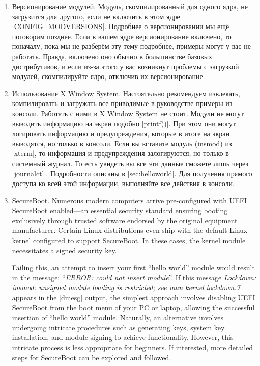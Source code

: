 \documentclass[10pt, oneside]{book}
\begin{document}
\begin{enumerate}
  \item Версионирование модулей.
        Модуль, скомпилированный для одного ядра, не загрузится для другого, если не включить в этом ядре \cpp|CONFIG_MODVERSIONS|. Подробнее о версионировании мы ещё поговорим позднее. Если в вашем ядре версионирование включено, то поначалу, пока мы не разберём эту тему подробнее,
        примеры могут у вас не работать. Правда, включено оно обычно в большинстве базовых дистрибутивов, и если из-за этого у вас возникнут проблемы с загрузкой модулей, скомпилируйте ядро, отключив их версионирование.

  \item Использование X Window System.
        Настоятельно рекомендуем извлекать, компилировать и загружать все приводимые в руководстве примеры из консоли. Работать с ними в X Window System не стоит.
        Модули не могут выводить информацию на экран подобно \cpp|printf()|. При этом они могут логировать информацию и предупреждения, которые в итоге на экран выводятся, но только в консоли.
        Если вы вставите модуль (insmod) из \sh|xterm|, то информация и предупреждения залогируются, но только в системный журнал. То есть увидеть вы все эти данные сможете лишь через \sh|journalctl|. Подробности описаны в \ref{sec:helloworld}. Для получения прямого доступа ко всей этой информации, выполняйте все действия в консоли.

  \item SecureBoot.
        Numerous modern computers arrive pre-configured with UEFI SecureBoot enabled—an essential security standard ensuring booting exclusively through trusted software endorsed by the original equipment manufacturer.
        Certain Linux distributions even ship with the default Linux kernel configured to support SecureBoot.
        In these cases, the kernel module necessitates a signed security key.

        Failing this, an attempt to insert your first ``hello world'' module would result in the message: ``\emph{ERROR: could not insert module}''.
        If this message \emph{Lockdown: insmod: unsigned module loading is restricted;
        see man kernel lockdown.7} appears in the \sh|dmesg| output,
        the simplest approach involves disabling UEFI SecureBoot from the boot menu of your PC or laptop,
        allowing the successful insertion of ``hello world'' module.
        Naturally, an alternative involves undergoing intricate procedures such as generating keys, system key installation,
        and module signing to achieve functionality.
        However, this intricate process is less appropriate for beginners. If interested,
        more detailed steps for \href{https://wiki.debian.org/SecureBoot}{SecureBoot} can be explored and followed.
\end{enumerate}
\end{document}
